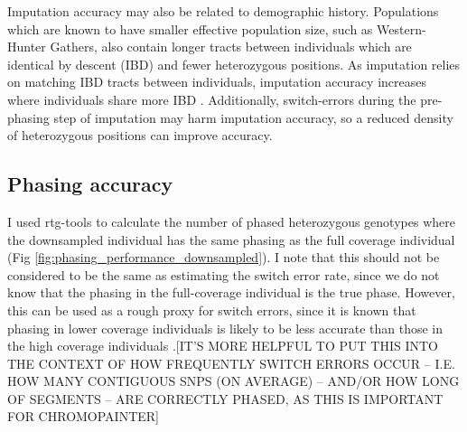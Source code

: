 Imputation accuracy may also be related to demographic history. Populations which are known to have smaller effective population size, such as Western-Hunter Gathers, also contain longer tracts between individuals which are identical by descent (IBD) and fewer heterozygous positions. As imputation relies on matching IBD tracts between individuals, imputation accuracy increases where individuals share more IBD \cite{kong2008detection}. Additionally, switch-errors during the pre-phasing step of imputation may harm imputation accuracy, so a reduced density of heterozygous positions can improve accuracy. 

\subsection{Phasing accuracy}

I used rtg-tools to calculate the number of phased heterozygous genotypes where the downsampled individual has the same phasing as the full coverage individual (Fig \ref{fig:phasing_performance_downsampled}). I note that this should not be considered to be the same as estimating the switch error rate, since we do not know that the phasing in the full-coverage individual is the true phase. However, this can be used as a rough proxy for switch errors, since it is known that phasing in lower coverage individuals is likely to be less accurate than those in the high coverage individuals \cite{rubinacci2021efficient}.{\color{red}[IT'S MORE HELPFUL TO PUT THIS INTO THE CONTEXT OF HOW FREQUENTLY SWITCH ERRORS OCCUR -- I.E. HOW MANY CONTIGUOUS SNPS (ON AVERAGE) -- AND/OR HOW LONG OF SEGMENTS -- ARE CORRECTLY PHASED, AS THIS IS IMPORTANT FOR CHROMOPAINTER]}

